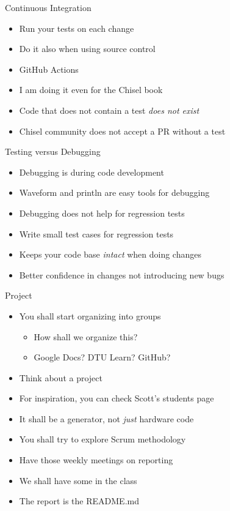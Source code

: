 \begin{frame}[fragile]{Continuous Integration}
\begin{itemize}
\item Run your tests on each change
\item Do it also when using source control
\item GitHub Actions
\item I am doing it even for the Chisel book
\item Code that does not contain a test \emph{does not exist}
\item Chisel community does not accept a PR without a test
\end{itemize}
\end{frame}

\begin{frame}[fragile]{Testing versus Debugging}
\begin{itemize}
\item Debugging is during code development
\item Waveform and println are easy tools for debugging
\item Debugging does not help for regression tests
\item Write small test cases for regression tests
\item Keeps your code base \emph{intact} when doing changes
\item Better confidence in changes not introducing new bugs
\end{itemize}
\end{frame}


\begin{frame}[fragile]{Project}
\begin{itemize}
\item You shall start organizing into groups
\begin{itemize}
\item How shall we organize this?
\item Google Docs? DTU Learn? GitHub?
\end{itemize}
\item Think about a project
\item For inspiration, you can check Scott's students page
\item It shall be a generator, not \emph{just} hardware code
\item You shall try to explore Scrum methodology
\item Have those weekly meetings on reporting
\item We shall have some in the class
\item The report is the README.md
\end{itemize}
\end{frame}

